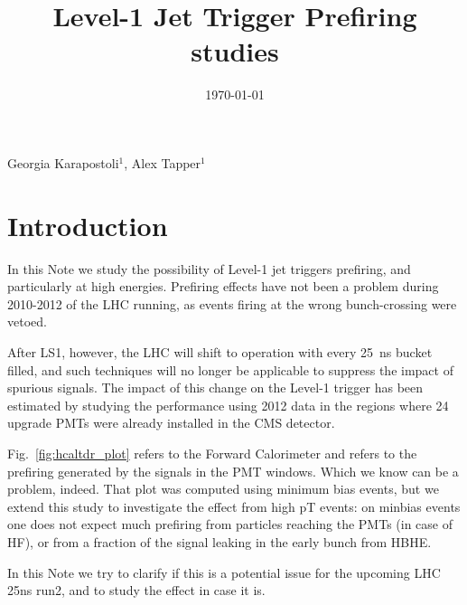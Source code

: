 \documentclass[11pt]{cmspaperpdf}
\newcommand{\mht}{\ensuremath{H_{\textrm{T}}^{\textrm{miss}}}}
\begin{document}
\begin{titlepage}


\date{\today}

%

\title{Level-1 Jet Trigger Prefiring studies}

\begin{Authlist}
 Georgia Karapostoli$^1$, Alex Tapper$^1$
\end{Authlist}


\abstract{

}

\end{titlepage}
\tableofcontents

\newpage
\section{Introduction}

In this Note we study the possibility of Level-1 jet triggers prefiring, and particularly at high energies. Prefiring effects have not been a problem during 2010-2012 of the LHC running, as events firing at the wrong bunch-crossing were vetoed.

After LS1, however, the LHC will shift to operation with every 25~ns bucket filled, and such techniques will no longer be applicable to suppress the impact of spurious signals. The impact of this change on the Level-1 trigger has been estimated by studying the performance using 2012 data in the regions where 24 upgrade PMTs were already installed in the CMS detector.

Fig.~\ref{fig:hcaltdr_plot} refers to the Forward Calorimeter and refers to the prefiring generated by the signals in the PMT windows. Which we know can be a problem, indeed. That plot was computed using minimum bias events, but we extend this study to investigate the effect from high pT events: on minbias events one does not expect much prefiring from particles reaching the PMTs (in case of HF), or from a fraction of the signal leaking in the early bunch from HBHE. 

In this Note we try to clarify if this is a potential issue for the upcoming LHC 25ns run2, and to study the effect in case it is.
\end{document}
